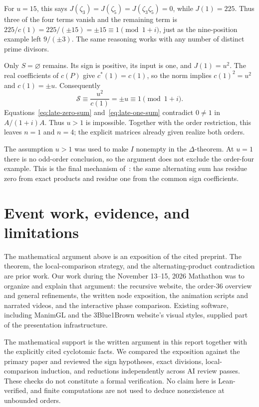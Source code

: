 \documentclass[11pt]{article}
\begin{document}
For $u=15$, this says
$J(\zeta_3)=J(\zeta_5)=J(\zeta_3\zeta_5)=0$, while $J(1)=225$.
Thus three of the four terms vanish and the remaining term is
$225/c(1)=225/(\pm15)=\pm15\equiv1\pmod{1+i}$, just as the
nine-position example left $9/(\pm3)$. The same reasoning works with
any number of distinct prime divisors.

Only $S=\varnothing$ remains. Its sign is positive, its input is one,
and $J(1)=u^{2}$. The real coefficients of $c(P)$ give
$c^{*}(1)=c(1)$, so the norm implies ${c(1)}^{2}=u^{2}$ and $c(1)=\pm u$.
Consequently
\begin{equation}
 \mathcal S\equiv\frac{u^{2}}{c(1)}=\pm u\equiv1\pmod{1+i}.%
 \label{eq:late-one-sum}
\end{equation}
Equations~\eqref{eq:late-zero-sum} and~\eqref{eq:late-one-sum}
contradict $0\ne1$ in $A/(1+i)A$. Thus $u>1$ is impossible.
Together with the order restriction, this leaves $n=1$ and $n=4$;
the explicit matrices already given realize both orders.

The assumption $u>1$ was used to make $I$ nonempty in the
$\Delta$-theorem. At $u=1$ there is no odd-order conclusion, so the
argument does not exclude the order-four example. This is the final
mechanism of~\cite[Section~4, especially Eq.~(4.11)]{circulant-source}:
the same alternating sum has residue zero from exact products and
residue one from the common sign coefficients.
\section{Event work, evidence, and limitations}%
\label{sec:evidence}

The mathematical argument above is an exposition of the cited preprint.
The theorem, the local-comparison strategy, and the alternating-product
contradiction are prior work. Our work during the November 13--15, 2026
Mathathon was to organize and explain that argument: the recursive website,
the order-36 overview and general refinements, the written node exposition,
the animation scripts and narrated videos, and the interactive phase
comparison. Existing software, including ManimGL and the 3Blue1Brown
website's visual styles, supplied part of the presentation infrastructure.

The mathematical support is the written argument in this report together
with the explicitly cited cyclotomic facts. We compared the exposition
against the primary paper and reviewed the sign hypotheses, exact
divisions, local-comparison induction, and reductions independently across
AI review passes. These checks do not constitute a formal verification.
No claim here is Lean-verified, and finite computations are not used to
deduce nonexistence at unbounded orders.
\end{document}
